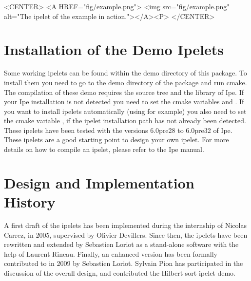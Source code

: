 \begin{ccHtmlOnly}
    <CENTER>
    <A HREF="fig/example.png">
        <img src="fig/example.png" alt="The ipelet of the example in action."></A><P>
    </CENTER>
\end{ccHtmlOnly}


\section{Installation of the Demo Ipelets}
Some working ipelets can be found within
the demo directory of this package. To install them you need
to go to the demo directory of the package and run cmake.
The compilation of these demo requires the source tree and the library of Ipe.
If your Ipe installation is not detected you need to set the cmake
variables  and . If you want
to install ipelets automatically (using  for example)
you also need to set the cmake variable , 
if the ipelet installation path has not already been detected.
These ipelets have been tested with the versions 6.0pre28 to 6.0pre32 of Ipe.
These ipelets are a good starting point to design your own ipelet. For more details on how
to compile an ipelet, please refer to the Ipe manual.



\section{Design and Implementation History}
A first draft of the \cgal{} ipelets has been implemented during the
internship of Nicolas Carrez, in 2005, supervised by Olivier Devillers.
Since then, the ipelets have been rewritten and extended by Sebastien
Loriot as a stand-alone software with the help of Laurent Rineau.
Finally, an enhanced version has been formally contributed to \cgal{} in 2009
by Sebastien Loriot. Sylvain Pion has participated in the discussion
of the overall design, and contributed the Hilbert sort ipelet demo.
